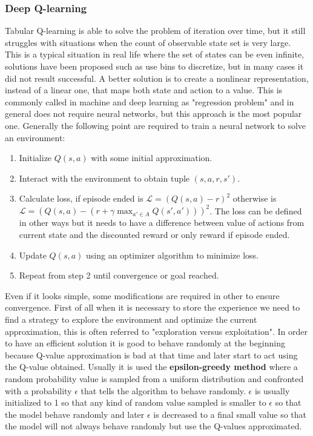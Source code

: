 \subsubsection{Deep Q-learning}
Tabular Q-learning is able to solve the problem of iteration over time, but it still struggles with situations when the count of observable state set is very large. This is a typical situation in real life where the set of states can be even infinite, solutions have been proposed such as use bins to discretize, but in many cases it did not result successful.
A better solution is to create a nonlinear representation, instead of a linear one, that maps both state and action to a value. This is commonly called in machine and deep learning as "regression problem" and in general does not require neural networks, but this approach is the most popular one.
Generally the following point are required to train a neural network to solve an environment:
\begin{enumerate}
	\item Initialize $Q(s,a)$ with some initial approximation.
	\item Interact with the environment to obtain tuple $(s,a,r,s')$.
	\item Calculate loss, if episode ended is $\mathcal{L} = (Q(s,a) - r)^2$ otherwise is $\mathcal{L} = (Q(s,a) - (r + \gamma \max_{a' \in A} Q(s',a')))^2$. The loss can be defined in other ways but it needs to have a difference between value of actions from current state and the discounted reward or only reward if episode ended.
	\item Update $Q(s,a)$ using an optimizer algorithm to minimize loss.
	\item Repeat from step 2 until convergence or goal reached.
\end{enumerate}
Even if it looks simple, some modifications are required in other to ensure convergence.
First of all when it is necessary to store the experience we need to find a strategy to explore the environment and optimize the current approximation, this is often referred to "exploration versus exploitation". In order to have an efficient solution it is good to behave randomly at the beginning because Q-value approximation is bad at that time and later start to act using the Q-value obtained. Usually it is used the \textbf{epsilon-greedy method} where a random probability value is sampled from a uniform distribution and confronted with a probability $\epsilon$  that tells the algorithm to behave randomly. $\epsilon$ is usually initialized to 1 so that any kind of random value sampled is smaller to $\epsilon$ so that the model behave randomly and later $\epsilon$ is decreased to a final small value so that the model will not always behave randomly but use the Q-values approximated. 

